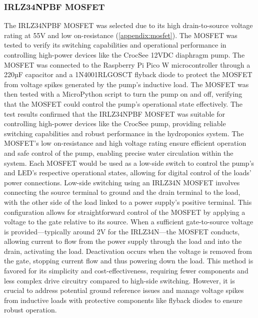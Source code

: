 \documentclass[12pt]{article} %
\begin{document}
\subsubsection{IRLZ34NPBF MOSFET}
\noindent The IRLZ34NPBF MOSFET was selected due to its high drain-to-source voltage rating at 55V and low on-resistance (\ref{appendix:mosfet}). The MOSFET was tested to verify its switching capabilities and operational performance in controlling high-power devices like the CrocSee 12VDC diaphragm pump. The MOSFET was connected to the Raspberry Pi Pico W microcontroller through a 220µF capacitor and a 1N4001RLGOSCT flyback diode to protect the MOSFET from voltage spikes generated by the pump's inductive load. The MOSFET was then tested with a MicroPython script to turn the pump on and off, verifying that the MOSFET could control the pump's operational state effectively. The test results confirmed that the IRLZ34NPBF MOSFET was suitable for controlling high-power devices like the CrocSee pump, providing reliable switching capabilities and robust performance in the hydroponics system. The MOSFET's low on-resistance and high voltage rating ensure efficient operation and safe control of the pump, enabling precise water circulation within the system. Each MOSFET would be used as a low-side switch to control the pump's and LED's respective operational states, allowing for digital control of the loads' power connections.
\newline
\newline
\noindent Low-side switching using an IRLZ34N MOSFET involves connecting the source terminal to ground and the drain terminal to the load, with the other side of the load linked to a power supply's positive terminal. This configuration allows for straightforward control of the MOSFET by applying a voltage to the gate relative to its source. When a sufficient gate-to-source voltage is provided—typically around 2V for the IRLZ34N—the MOSFET conducts, allowing current to flow from the power supply through the load and into the drain, activating the load. Deactivation occurs when the voltage is removed from the gate, stopping current flow and thus powering down the load. This method is favored for its simplicity and cost-effectiveness, requiring fewer components and less complex drive circuitry compared to high-side switching. However, it is crucial to address potential ground reference issues and manage voltage spikes from inductive loads with protective components like flyback diodes to ensure robust operation.

\pagebreak
\end{document}
